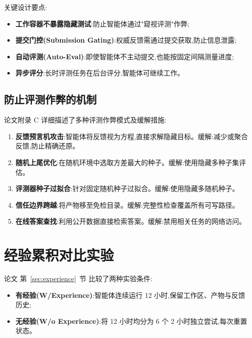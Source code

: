 \documentclass[a4paper,11pt]{article}
\newcommand{\secref}[1]{第~\ref{#1}~节}
\begin{document}
关键设计要点:

\begin{itemize}
    \item \textbf{工作容器不暴露隐藏测试}:防止智能体通过"窥视评测"作弊;
    \item \textbf{提交门控(Submission Gating)}:权威反馈需通过提交获取,防止信息泄露;
    \item \textbf{自动评测(Auto-Eval)}:即使智能体不主动提交,也能按固定间隔测量进度;
    \item \textbf{异步评分}:长时评测任务在后台评分,智能体可继续工作。
\end{itemize}

\subsection{防止评测作弊的机制}

论文附录 C 详细描述了多种评测作弊模式及缓解措施:

\begin{enumerate}
    \item \textbf{反馈预言机攻击}:智能体将反馈视为方程,直接求解隐藏目标。缓解:减少或聚合反馈,防止精确还原。
    \item \textbf{随机上尾优化}:在随机环境中选取方差最大的种子。缓解:使用隐藏多种子集评估。
    \item \textbf{评测器种子过拟合}:针对固定随机种子过拟合。缓解:使用隐藏多随机种子。
    \item \textbf{信任边界跨越}:将产物移至免检目录。缓解:完整性检查覆盖所有可写路径。
    \item \textbf{在线答案查找}:利用公开数据直接检索答案。缓解:禁用相关任务的网络访问。
\end{enumerate}

\section{经验累积对比实验}

论文 \secref{sec:experience} 比较了两种实验条件:
\begin{itemize}
    \item \textbf{有经验(W/Experience)}:智能体连续运行 12 小时,保留工作区、产物与反馈历史;
    \item \textbf{无经验(W/o Experience)}:将 12 小时均分为 6 个 2 小时独立尝试,每次重置状态。
\end{itemize}
\end{document}
